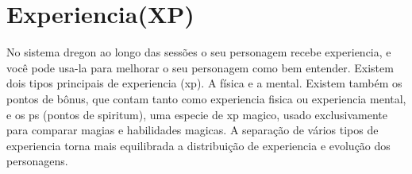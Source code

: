 





\section{Experiencia(XP)}

No sistema dregon ao longo das sessões o seu personagem recebe experiencia, e você pode usa-la para melhorar o seu personagem como bem entender. Existem dois tipos principais de experiencia (xp). A física e a mental. Existem também os pontos de bônus, que contam tanto como experiencia fisica ou experiencia mental, e os ps (pontos de spiritum), uma especie de xp magico, usado exclusivamente para comparar magias e habilidades magicas. A separação de vários tipos de experiencia torna mais equilibrada a distribuição de experiencia e evolução dos personagens.



